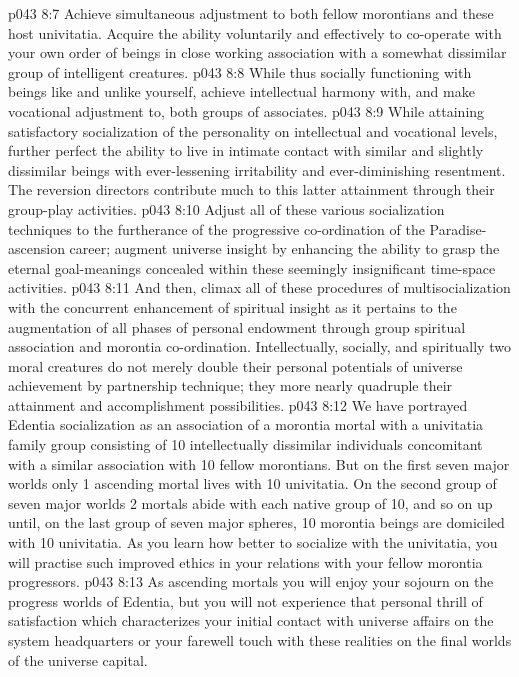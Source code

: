 \vs p043 8:7 \bibnobreakspace Achieve simultaneous adjustment to both fellow morontians and these host univitatia. Acquire the ability voluntarily and effectively to co\hyp{}operate with your own order of beings in close working association with a somewhat dissimilar group of intelligent creatures.
\vs p043 8:8 \bibnobreakspace While thus socially functioning with beings like and unlike yourself, achieve intellectual harmony with, and make vocational adjustment to, both groups of associates.
\vs p043 8:9 \bibnobreakspace While attaining satisfactory socialization of the personality on intellectual and vocational levels, further perfect the ability to live in intimate contact with similar and slightly dissimilar beings with ever\hyp{}lessening irritability and ever\hyp{}diminishing resentment. The reversion directors contribute much to this latter attainment through their group\hyp{}play activities.
\vs p043 8:10 \bibnobreakspace Adjust all of these various socialization techniques to the furtherance of the progressive co\hyp{}ordination of the Paradise\hyp{}ascension career; augment universe insight by enhancing the ability to grasp the eternal goal\hyp{}meanings concealed within these seemingly insignificant time\hyp{}space activities.
\vs p043 8:11 \bibnobreakspace And then, climax all of these procedures of multisocialization with the concurrent enhancement of spiritual insight as it pertains to the augmentation of all phases of personal endowment through group spiritual association and morontia co\hyp{}ordination. Intellectually, socially, and spiritually two moral creatures do not merely double their personal potentials of universe achievement by partnership technique; they more nearly quadruple their attainment and accomplishment possibilities.
\vs p043 8:12 \pc We have portrayed Edentia socialization as an association of a morontia mortal with a univitatia family group consisting of 10 intellectually dissimilar individuals concomitant with a similar association with 10 fellow morontians. But on the first seven major worlds only 1 ascending mortal lives with 10 univitatia. On the second group of seven major worlds 2 mortals abide with each native group of 10, and so on up until, on the last group of seven major spheres, 10 morontia beings are domiciled with 10 univitatia. As you learn how better to socialize with the univitatia, you will practise such improved ethics in your relations with your fellow morontia progressors.
\vs p043 8:13 As ascending mortals you will enjoy your sojourn on the progress worlds of Edentia, but you will not experience that personal thrill of satisfaction which characterizes your initial contact with universe affairs on the system headquarters or your farewell touch with these realities on the final worlds of the universe capital.
